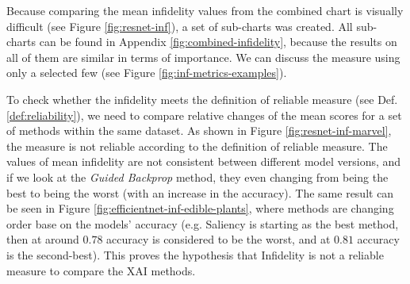 Because comparing the mean infidelity values from the combined chart is visually difficult (see Figure \ref{fig:resnet-inf}), a set of sub-charts was created. All sub-charts can be found in Appendix \ref{fig:combined-infidelity}, because the results on all of them are similar in terms of importance. We can discuss the measure using only a selected few (see Figure \ref{fig:inf-metrics-examples}). 

\vspace{\baselineskip}

To check whether the infidelity meets the definition of reliable measure (see Def. \ref{def:reliability}), we need to compare relative changes of the mean scores for a set of methods within the same dataset. As shown in Figure \ref{fig:resnet-inf-marvel}, the measure is not reliable according to the definition of reliable measure. The values of mean infidelity are not consistent between different model versions, and if we look at the \textit{Guided Backprop} method, they even changing from being the best to being the worst (with an increase in the accuracy). The same result can be seen in Figure \ref{fig:efficientnet-inf-edible-plants}, where methods are changing order base on the models' accuracy (e.g. Saliency is starting as the best method, then at around $0.78$ accuracy is considered to be the worst, and at $0.81$ accuracy is the second-best). This proves the hypothesis that Infidelity is not a reliable measure to compare the XAI methods. 

